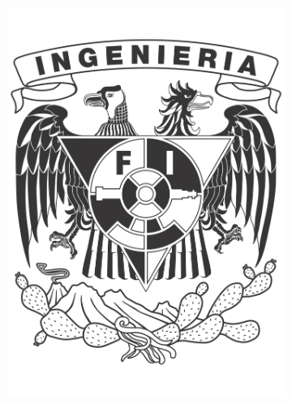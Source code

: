 \documentclass[12pt, titlepage]{report}
\begin{document}
\begin{titlepage}
\begin{center}
\begin{figure}[ht]
\begin{subfigure}[l]{0.15\textwidth}
                    \includegraphics[width=\textwidth]{Escudo_FI.png}
                \end{subfigure} 
            \end{figure}


\end{center}
\end{titlepage}
\end{document}
